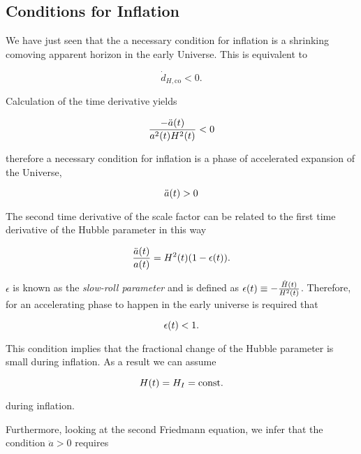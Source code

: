 \subsection{Conditions for Inflation}

We have just seen that the a necessary condition for inflation is a
shrinking comoving apparent horizon in the early Universe. This is
equivalent to

\begin{equation}
        \dot d_{H,\text{co}} < 0.
\end{equation}

Calculation of the time derivative yields

\begin{equation}
        \frac{-\ddot a\qty(t)}{a^2\qty(t) H^2\qty(t)} < 0
\end{equation}

therefore a necessary condition for inflation is a phase of accelerated
expansion of the Universe,

\begin{equation}
        \ddot a\qty(t) > 0
\end{equation}

The second time derivative of the scale factor can be related to the first
time derivative of the Hubble parameter in this way

\begin{equation}
        \frac{\ddot a\qty(t)}{a\qty(t)} = H^2\qty(t)\qty(1 - \epsilon\qty(t)).
\end{equation}

$\epsilon$ is known as the \emph{slow-roll parameter} and is defined as
$\epsilon\qty(t) \equiv -\frac{\dot H\qty(t)}{H^2\qty(t)}$.
Therefore, for an accelerating phase to happen in the early universe is
required that

\begin{equation}
        \epsilon\qty(t) < 1.
\end{equation}

This condition implies that the fractional change of the Hubble parameter
is small during inflation. As a result we can assume

\begin{equation}
        H\qty(t) = H_I = \text{const.}
\end{equation}

during inflation.

Furthermore, looking at the second Friedmann equation, we infer that the condition $\ddot
a > 0$ requires

